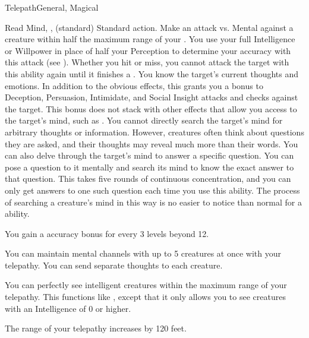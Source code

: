 \begin{magicalfeat}{Telepath}{General, Magical}
        \begin{magicalsustainability}{Read Mind}{, ,  (standard)}
            \abilityusagetime Standard action.
            \rankline
            Make an attack vs. Mental against a creature within half the maximum range of your .
            You use your full Intelligence or Willpower in place of half your Perception to determine your accuracy with this attack (see ).
            Whether you hit or miss, you cannot attack the target with this ability again until it finishes a .
            \hit You know the target's current thoughts and emotions.
            In addition to the obvious effects, this grants you a  bonus to Deception, Persuasion, Intimidate, and Social Insight attacks and checks against the target.
            This bonus does not stack with other effects that allow you access to the target's mind, such as .
            You cannot directly search the target's mind for arbitrary thoughts or information.
            However, creatures often think about questions they are asked, and their thoughts may reveal much more than their words.
            \crit You can also delve through the target's mind to answer a specific question.
            You can pose a question to it mentally and search its mind to know the exact answer to that question.
            This takes five rounds of continuous concentration, and you can only get answers to one such question each time you use this ability.
            The process of searching a creature's mind in this way is no easier to notice than normal for a  ability.

            \rankline
            You gain a  accuracy bonus for every 3 levels beyond 12.
        \end{magicalsustainability}

         You can maintain mental channels with up to 5 creatures at once with your telepathy.
        You can send separate thoughts to each creature.

         You can perfectly see intelligent creatures within the maximum range of your telepathy.
        This functions like , except that it only allows you to see creatures with an Intelligence of 0 or higher.

         The range of your telepathy increases by 120 feet.
    \end{magicalfeat}

